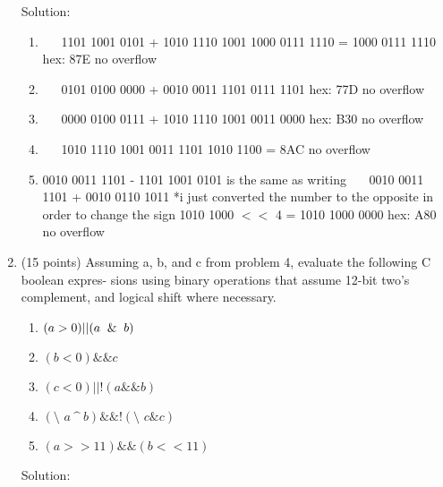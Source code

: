 \documentclass[11pt]{article}
\begin{document}
\begin{enumerate}
Solution: 

\begin{enumerate}
	\item \ \ \ 1101 1001 0101 \newline + 1010 1110 1001  1000 0111 1110 = 1000 0111 1110 hex: 87E no overflow
	\item \ \ \ 0101 0100 0000 \newline +  0010 0011 1101  0111 1101  hex: 77D no overflow 
	\item \ \ \ 0000 0100 0111 \newline + 1010 1110 1001  0011 0000 hex: B30 no overflow 
	\item \ \ \ 1010 1110 1001  0011 1101  1010 1100 = 8AC no overflow 
	\item 0010 0011 1101 - 1101 1001 0101 is the same as writing \newline \ \ \ 0010 0011 1101 \newline + 0010 0110 1011 *i just converted the number to the opposite in order to change the sign  1010 1000 $<<$ 4 = 1010 1000 0000 hex: A80 no overflow 
\end{enumerate}

\item (15 points) Assuming a, b, and c from problem 4, evaluate the following C boolean expres- sions using binary operations that assume 12-bit two’s complement, and logical shift where necessary.
\begin{enumerate}
    \item	$(a>0) || (a \And b)$
    \item $(b<0) \&\& c$
    \item $(c<0) || !(a \&\& b)$
    \item $(\texttt{\char`\~} a\  \^ \ b) \& \&  !(\texttt{\char`\~} c\& c)$ 
    \item $(a>>11)\& \& (b<<11)$
\end{enumerate}{}

Solution:


\end{enumerate}
\end{document}
